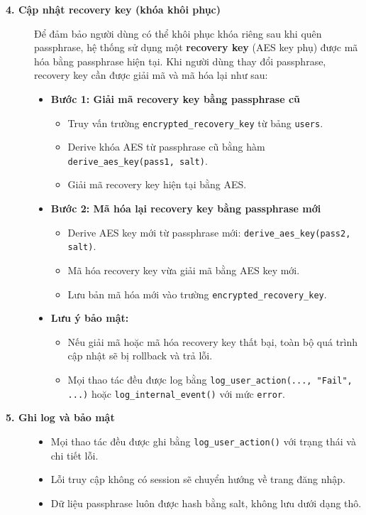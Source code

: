 \begin{description}
    \item[\textbf{4. Cập nhật recovery key (khóa khôi phục)}]
    Để đảm bảo người dùng có thể khôi phục khóa riêng sau khi quên passphrase, hệ thống sử dụng một \textbf{recovery key} (AES key phụ) được mã hóa bằng passphrase hiện tại. Khi người dùng thay đổi passphrase, recovery key cần được giải mã và mã hóa lại như sau:

    \begin{itemize}
        \item \textbf{Bước 1: Giải mã recovery key bằng passphrase cũ}
        \begin{itemize}
            \item Truy vấn trường \texttt{encrypted\_recovery\_key} từ bảng \texttt{users}.
            \item Derive khóa AES từ passphrase cũ bằng hàm \texttt{derive\_aes\_key(pass1, salt)}.
            \item Giải mã recovery key hiện tại bằng AES.
        \end{itemize}

        \item \textbf{Bước 2: Mã hóa lại recovery key bằng passphrase mới}
        \begin{itemize}
            \item Derive AES key mới từ passphrase mới: \texttt{derive\_aes\_key(pass2, salt)}.
            \item Mã hóa recovery key vừa giải mã bằng AES key mới.
            \item Lưu bản mã hóa mới vào trường \texttt{encrypted\_recovery\_key}.
        \end{itemize}

        \item \textbf{Lưu ý bảo mật:}
        \begin{itemize}
            \item Nếu giải mã hoặc mã hóa recovery key thất bại, toàn bộ quá trình cập nhật sẽ bị rollback và trả lỗi.
            \item Mọi thao tác đều được log bằng \texttt{log\_user\_action(..., "Fail", ...)} hoặc \texttt{log\_internal\_event()} với mức \texttt{error}.
        \end{itemize}
    \end{itemize}

    \item[\textbf{5. Ghi log và bảo mật}]
    \begin{itemize}
        \item Mọi thao tác đều được ghi bằng \texttt{log\_user\_action()} với trạng thái và chi tiết lỗi.
        \item Lỗi truy cập không có session sẽ chuyển hướng về trang đăng nhập.
        \item Dữ liệu passphrase luôn được hash bằng salt, không lưu dưới dạng thô.
    \end{itemize}


\end{description}

